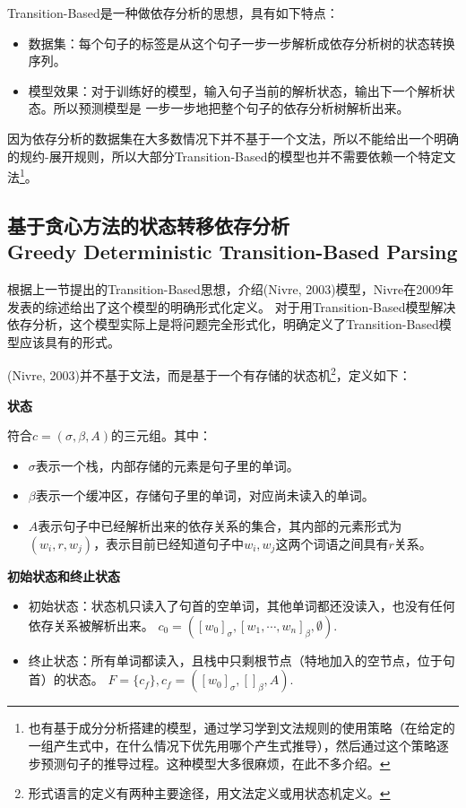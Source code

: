 Transition-Based是一种做依存分析的思想，具有如下特点：

\begin{itemize}
    \item 数据集：每个句子的标签是从这个句子一步一步解析成依存分析树的状态转换序列。
    \item 模型效果：对于训练好的模型，输入句子当前的解析状态，输出下一个解析状态。所以预测模型是 一步一步地把整个句子的依存分析树解析出来。
\end{itemize}

因为依存分析的数据集在大多数情况下并不基于一个文法，所以不能给出一个明确的规约-展开规则，所以大部分Transition-Based的模型也并不需要依赖一个特定文法\footnote{也有基于成分分析搭建的模型，通过学习学到文法规则的使用策略（在给定的一组产生式中，在什么情况下优先用哪个产生式推导），然后通过这个策略逐步预测句子的推导过程。这种模型大多很麻烦，在此不多介绍。}。

\subsection{基于贪心方法的状态转移依存分析 \\ Greedy Deterministic Transition-Based Parsing}

根据上一节提出的Transition-Based思想，介绍(Nivre, 2003)模型，Nivre在2009年发表的综述\cite{04-NivreP}给出了这个模型的明确形式化定义。
对于用Transition-Based模型解决依存分析，这个模型实际上是将问题完全形式化，明确定义了Transition-Based模型应该具有的形式。

(Nivre, 2003)并不基于文法，而是基于一个有存储的状态机\footnote{形式语言的定义有两种主要途径，用文法定义或用状态机定义。\cite{04-tj}}，定义如下：

\textbf{状态}

符合$c = (\sigma, \beta, A)$的三元组。其中：

\begin{itemize}
    \item $\sigma$表示一个栈，内部存储的元素是句子里的单词。
    \item $\beta$表示一个缓冲区，存储句子里的单词，对应尚未读入的单词。
    \item $A$表示句子中已经解析出来的依存关系的集合，其内部的元素形式为$(w_i, r, w_j)$，表示目前已经知道句子中$w_i, w_j$这两个词语之间具有$r$关系。
\end{itemize}

\textbf{初始状态和终止状态}

\begin{itemize}
    \item 初始状态：状态机只读入了句首的空单词，其他单词都还没读入，也没有任何依存关系被解析出来。
    $c_0 = ([w_0]_\sigma, [w_1, \cdots, w_n]_\beta, \emptyset)$.
    \item 终止状态：所有单词都读入，且栈中只剩根节点（特地加入的空节点，位于句首）的状态。
    $F = \{c_f\}, c_f = ([w_0]_\sigma, []_\beta, A)$.
\end{itemize}

